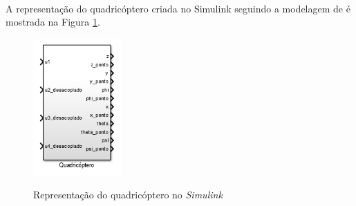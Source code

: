 A representação do quadricóptero criada no Simulink\textsuperscript{\textregistered} seguindo a modelagem de  é mostrada na Figura \ref{fig:diagram_drone_block}.

\begin{figure}[!htb]
    \centering
    \caption{Representação do quadricóptero no \textit{Simulink}}
    \includegraphics[width=0.3\textwidth]{./04-figuras/figuras_pos_banca/1-mostrando_desacoplamento/diagram_drone_block}
    \label{fig:diagram_drone_block}
\end{figure}